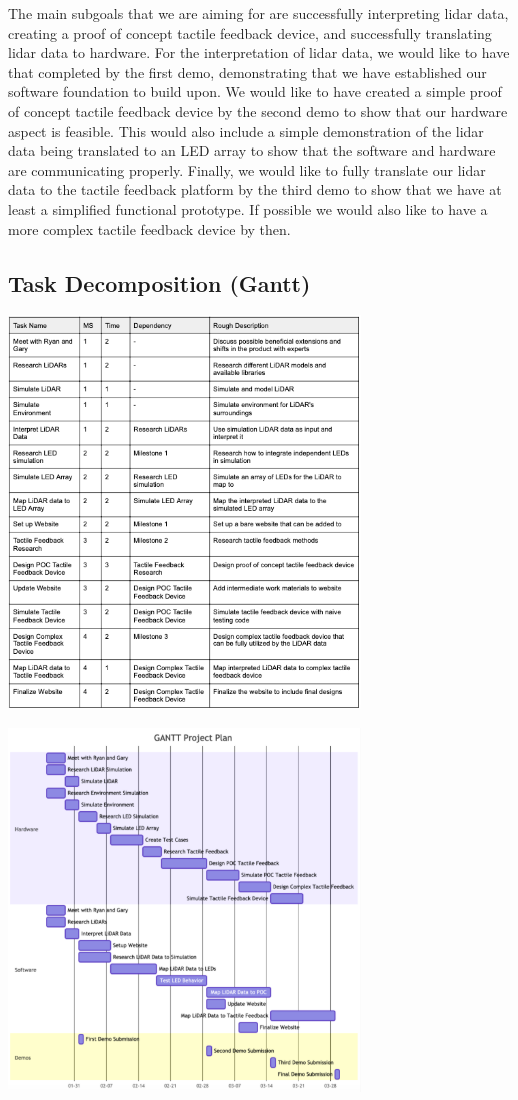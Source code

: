 \documentclass{article}
\begin{document}
The main subgoals that we are aiming for are successfully interpreting lidar data, creating a proof of concept tactile feedback device, and successfully translating lidar data to hardware. For the interpretation of lidar data, we would like to have that completed by the first demo, demonstrating that we have established our software foundation to build upon. We would like to have created a simple proof of concept tactile feedback device by the second demo to show that our hardware aspect is feasible. This would also include a simple demonstration of the lidar data being translated to an LED array to show that the software and hardware are communicating properly. Finally, we would like to fully translate our lidar data to the tactile feedback platform by the third demo to show that we have at least a simplified functional prototype. If possible we would also like to have a more complex tactile feedback device by then.

\subsection{Task Decomposition (Gantt)}
\begin{center}
    \includegraphics [width=0.7\textwidth]{Gantt.png}
\end{center}
\begin{center}
    \includegraphics [width=0.7\textwidth]{Gantt PP.png}
\end{center}
\end{document}
